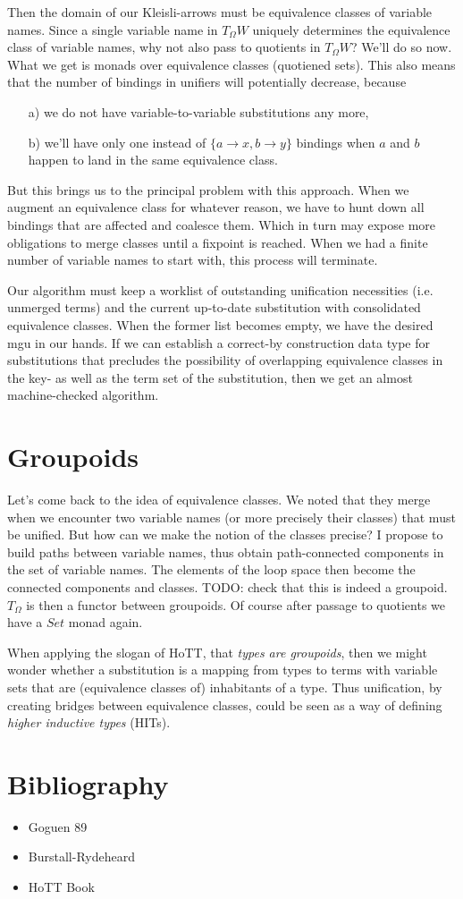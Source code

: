 \documentclass{article}
\begin{document}
Then the domain of our Kleisli-arrows must be equivalence classes of variable names. Since a single variable name in $T_{\Omega}W$ uniquely determines the equivalence class of variable names, why not also pass to quotients in $T_{\Omega}W$?
We'll do so now. What we get is monads over equivalence classes (quotiened sets). This also means that the number of bindings in unifiers will potentially decrease, because
\begin{itemize}
\item[a)] we do not have variable-to-variable substitutions any more,
\item[b)] we'll have only one instead of $\{a \to x, b \to y\}$ bindings when $a$ and $b$ happen to land in the same equivalence class.
\end{itemize}
But this brings us to the principal problem with this approach. When we augment an equivalence class for whatever reason, we have to hunt down all bindings that are affected and coalesce them. Which in turn may expose more obligations to merge classes until a fixpoint is reached. When we had a finite number of variable names to start with, this process will terminate.
\par Our algorithm must keep a worklist of outstanding unification necessities (i.e. unmerged terms) and the current up-to-date substitution with consolidated equivalence classes.
When the former list becomes empty, we have the desired mgu in our hands.
If we can establish a correct-by construction data type for substitutions that precludes the possibility of overlapping equivalence classes in the key- as well as the term set of the substitution, then we get an almost machine-checked algorithm.

\section {Groupoids}
Let's come back to the idea of equivalence classes. We noted that they merge when we encounter two variable names (or more precisely their classes) that must be unified. But how can we make the notion of the classes precise? I propose to build paths between variable names, thus obtain path-connected components in the set of variable names. The elements of the loop space then become the connected components and classes. TODO: check that this is indeed a groupoid. $T_{\Omega}$ is then a functor between groupoids. Of course after passage to quotients we have a $Set$ monad again.
\par When applying the slogan of HoTT, that \emph {types are groupoids}, then we might wonder whether a substitution is a mapping from types to terms with variable sets that are (equivalence classes of) inhabitants of a type. Thus unification, by creating bridges between equivalence classes, could be seen as a way of defining \emph {higher inductive types} (HITs).

\section {Bibliography}
\begin{itemize}
\item Goguen 89
\item Burstall-Rydeheard
\item HoTT Book
\end{itemize}
\end{document}
